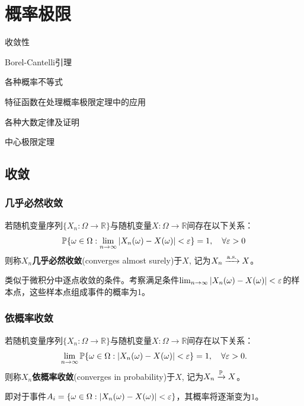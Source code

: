 \chapter{概率极限}\label{chap:limitation}
\begin{introduction}[考试重点]
    \item 收敛性
    \item Borel-Cantelli引理
    \item 各种概率不等式
    \item 特征函数在处理概率极限定理中的应用
    \item 各种大数定律及证明
    \item 中心极限定理
\end{introduction}
\section{收敛}

\subsection{几乎必然收敛}

\begin{definition}[几乎必然收敛]
    若随机变量序列$\{ X_n: \Omega \to \mathbb{R} \}$与随机变量$X:\Omega \to \mathbb{R}$间存在以下关系：
    \[ \P\{ \omega \in \Omega: \lim_{n \to \infty}\abs{ X_n(\omega) - X(\omega)} < \e \} =1,\quad \forall \e > 0\]
    则称$X_n$\textbf{几乎必然收敛}(converges almost surely)于$X$, 记为$X_n \xrightarrow{\as} X$。
\end{definition}
\begin{remark}
    类似于微积分中逐点收敛的条件。考察满足条件$\lim_{n \to \infty}\abs{ X_n(\omega) - X(\omega)} < \e$的样本点，这些样本点组成事件的概率为1。
\end{remark}

\subsection{依概率收敛}

\begin{definition}[依概率收敛]
    若随机变量序列$\{ X_n: \Omega \to \mathbb{R} \}$与随机变量$X:\Omega \to \mathbb{R}$间存在以下关系：
    \[ \lim_{n\to\infty}\P\{\omega \in \Omega: \abs{X_n(\omega) - X(\omega)}<\e\} = 1, \quad \forall \e>0. \]
    则称$X_n$\textbf{依概率收敛}(converges in probability)于$X$, 记为$X_n \xrightarrow{\P} X$。
\end{definition}
\begin{remark}
    即对于事件$A_i=\{\omega \in \Omega: \abs{X_n(\omega) - X(\omega)}<\e\}$，其概率将逐渐变为$1$。
\end{remark}


